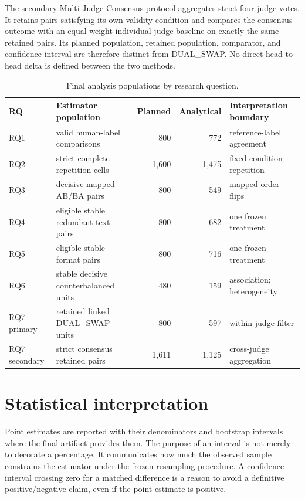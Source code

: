 The secondary Multi-Judge Consensus protocol aggregates strict four-judge votes. It retains pairs satisfying its own validity condition and compares the consensus outcome with an equal-weight individual-judge baseline on exactly the same retained pairs. Its planned population, retained population, comparator, and confidence interval are therefore distinct from DUAL\_SWAP. No direct head-to-head delta is defined between the two methods.

\begin{table}[H]
\centering
\caption{Final analysis populations by research question.}
\label{tab:populations}
\begin{tabularx}{\textwidth}{@{}p{}p{}r r X@{}}
\toprule
RQ & Estimator population & Planned & Analytical & Interpretation boundary\\
\midrule
RQ1 & valid human-label comparisons & 800 & 772 & reference-label agreement\\
RQ2 & strict complete repetition cells & 1,600 & 1,475 & fixed-condition repetition\\
RQ3 & decisive mapped AB/BA pairs & 800 & 549 & mapped order flips\\
RQ4 & eligible stable redundant-text pairs & 800 & 682 & one frozen treatment\\
RQ5 & eligible stable format pairs & 800 & 716 & one frozen treatment\\
RQ6 & stable decisive counterbalanced units & 480 & 159 & association; heterogeneity\\
RQ7 primary & retained linked DUAL\_SWAP units & 800 & 597 & within-judge filter\\
RQ7 secondary & strict consensus retained pairs & 1,611 & 1,125 & cross-judge aggregation\\
\bottomrule
\end{tabularx}
\end{table}

\section{Statistical interpretation}

Point estimates are reported with their denominators and bootstrap intervals where the final artifact provides them. The purpose of an interval is not merely to decorate a percentage. It communicates how much the observed sample constrains the estimator under the frozen resampling procedure. A confidence interval crossing zero for a matched difference is a reason to avoid a definitive positive/negative claim, even if the point estimate is positive.

